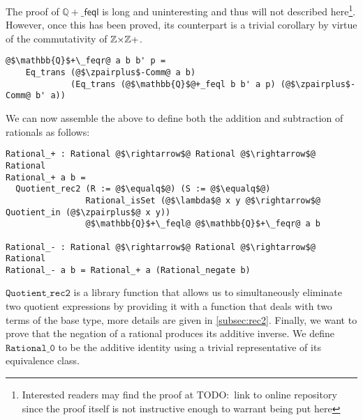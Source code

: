 \documentclass[12pt,twoside,maitrise]{dms}
\theoremstyle{definition}
\numberwithin{equation}{section}
\numberwithin{table}{chapter}
\numberwithin{figure}{chapter}
\newcommand\kw[1] {\textsf{#1}}
\newcommand\id[1] {\texttt{#1}}
\begin{document}
The proof of $\mathbb{Q}{+}\_\kw{feql}$ is long and uninteresting and thus will
not described here\footnote{Interested readers may find the proof at TODO:\ link
to online repository since the proof itself is not instructive enough to
warrant being put here}. However, once this has been proved, its counterpart is
a trivial corollary by virtue of the commutativity of $\mathbb{Z}{\times}\mathbb{Z}+$.

\begin{verbatim}
@$\mathbb{Q}$+\_feqr@ a b b' p =
    Eq_trans (@$\zpairplus$-Comm@ a b)
             (Eq_trans (@$\mathbb{Q}$@+_feql b b' a p) (@$\zpairplus$-Comm@ b' a))
\end{verbatim}

We can now assemble the above to define both the addition and subtraction of
rationals as follows:

\begin{verbatim}
Rational_+ : Rational @$\rightarrow$@ Rational @$\rightarrow$@ Rational
Rational_+ a b =
  Quotient_rec2 (R := @$\equalq$@) (S := @$\equalq$@)
                Rational_isSet (@$\lambda$@ x y @$\rightarrow$@ Quotient_in (@$\zpairplus$@ x y))
                @$\mathbb{Q}$+\_feql@ @$\mathbb{Q}$+\_feqr@ a b

Rational_- : Rational @$\rightarrow$@ Rational @$\rightarrow$@ Rational
Rational_- a b = Rational_+ a (Rational_negate b)
\end{verbatim}

$\id{Quotient\_rec2}$ is a library function that allows us to simultaneously
eliminate two quotient expressions by providing it with a function that deals
with two terms of the base type, more details are given in
\autoref{subsec:rec2}. Finally, we want to prove that the negation of a rational
produces its additive inverse. We define $\id{Rational\_0}$ to be the additive
identity using a trivial representative of its equivalence class.
\end{document}
